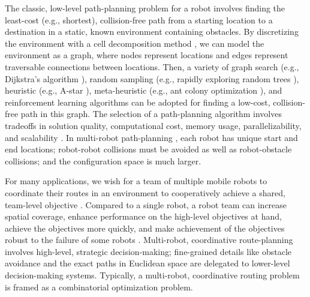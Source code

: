 \documentclass[fleqn,10pt,lineno]{wlpeerj}
\begin{document}
The classic, low-level path-planning problem for a robot \cite{lavalle2006planning,agrawal2022classical} involves finding the least-cost (e.g., shortest), collision-free path from a starting location to a destination in a static, known environment containing obstacles.
By discretizing the environment with a cell decomposition method \cite{latombe2012robot}, we can model the environment as a graph, where nodes represent locations and edges represent traversable connections between locations. Then, a variety of graph search (e.g., Dijkstra's algorithm \cite{candra2020dijkstra}), random sampling (e.g., rapidly exploring random trees \cite{lavalle1998rapidly}), heuristic (e.g., A-star \cite{candra2020dijkstra}), meta-heuristic (e.g., ant colony optimization \cite{brand2010ant}), and reinforcement learning \cite{singh2023review} algorithms can be adopted for finding a low-cost, collision-free path in this graph. 
The selection of a path-planning algorithm involves tradeoffs in solution quality, computational cost, memory usage, parallelizability, and scalability \cite{ugwoke2025simulation}.
In multi-robot path-planning \cite{wagner2011m}, each robot has unique start and end locations; robot-robot collisions must be avoided as well as robot-obstacle collisions; and the configuration space is much larger.

For many applications, we wish for a team of multiple mobile robots to coordinate their routes in an environment to cooperatively achieve a shared, team-level objective \cite{parker1995design,parker2007distributed}.
Compared to a single robot, a robot team can increase spatial coverage, enhance performance on the high-level objectives at hand, achieve the objectives more quickly, and make achievement of the objectives robust to the failure of some robots \cite{schranz2020swarm,brambilla2013swarm}.
Multi-robot, coordinative route-planning involves high-level, strategic decision-making; fine-grained details like obstacle avoidance and the exact paths in Euclidean space are delegated to lower-level decision-making systems. 
Typically, a multi-robot, coordinative routing problem is framed as a combinatorial optimization problem.
\end{document}
